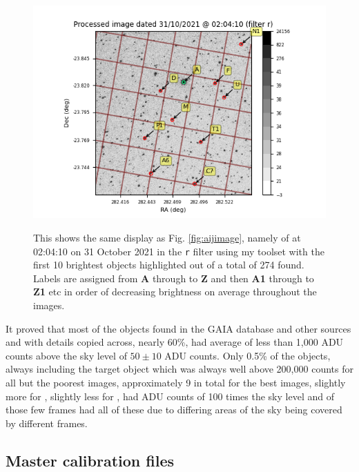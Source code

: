 \begin{figure}[!htbp]
\begin{center}
\includegraphics[scale=0.80]{images/myimage.png} \\
\vspace{-.5cm}
\end{center}
\caption{This shows the same display as Fig. \ref{fig:aijimage}, namely of
{\ross} at 02:04:10 on 31 October 2021 in the \texttt{r} filter using my
toolset with the first 10 brightest objects highlighted out of a total of 274
found. Labels are assigned from \textbf{A} through to \textbf{Z} and then
\textbf{A1} through to \textbf{Z1} etc in order of decreasing brightness on
average throughout the images.} \protect\label{fig:myimage}
\end{figure}

It proved that most of the objects found in the GAIA database and other sources
and with details copied across, nearly 60\%, had average of less than 1,000 ADU
counts above the sky level of $50 \pm 10$ ADU counts. Only 0.5\% of the objects,
always including the target object which was always well above 200,000 counts
for all but the poorest images, approximately 9 in total for the best {\ross}
images, slightly more for \prox, slightly less for \bstar, had ADU counts of 100
times the sky level and of those few frames had all of these due to differing
areas of the sky being covered by different frames.

\subsection{Master calibration files}
\protect\label{section:masterbiasflat}

